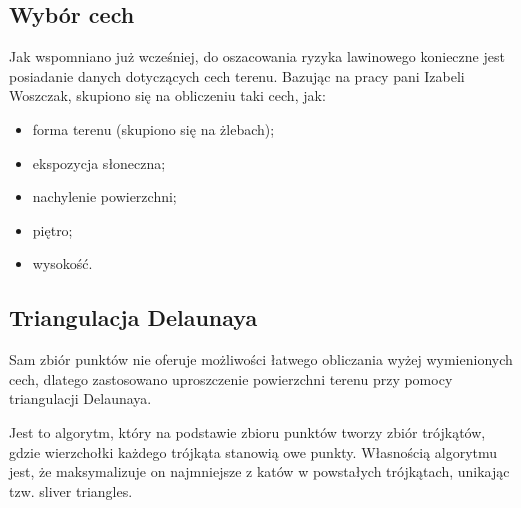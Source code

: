 \subsection{Wybór cech}
Jak wspomniano już wcześniej, do oszacowania ryzyka lawinowego konieczne jest posiadanie danych dotyczących cech terenu. Bazując na pracy pani Izabeli Woszczak, skupiono się na obliczeniu taki cech, jak:
\begin{itemize}
	\item forma terenu (skupiono się na żlebach);
	\item ekspozycja słoneczna;
	\item nachylenie powierzchni;
	\item piętro;
	\item wysokość.
\end{itemize}

\subsection{Triangulacja Delaunaya}
Sam zbiór punktów nie oferuje możliwości łatwego obliczania wyżej wymienionych cech, dlatego zastosowano uproszczenie powierzchni terenu przy pomocy triangulacji Delaunaya.

Jest to algorytm, który na podstawie zbioru punktów tworzy zbiór trójkątów, gdzie wierzchołki każdego trójkąta stanowią owe punkty. Własnością algorytmu jest, że maksymalizuje on najmniejsze z katów w powstałych trójkątach, unikając tzw. sliver triangles.


